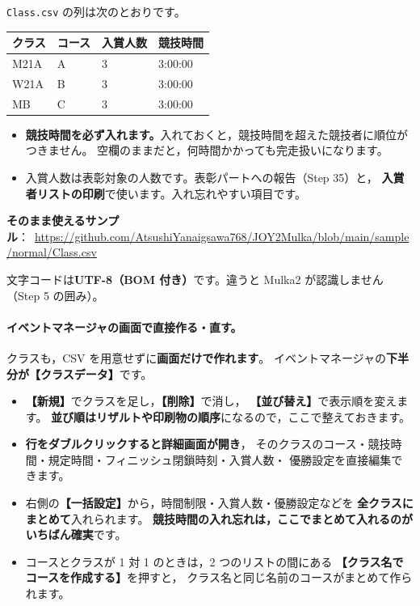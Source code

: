 \texttt{Class.csv} の列は次のとおりです。

\begin{center}
\small
\begin{tabular}{@{}llll@{}}
\toprule
クラス & コース & 入賞人数 & 競技時間 \\
\midrule
M21A & A & 3 & 3:00:00 \\
W21A & B & 3 & 3:00:00 \\
MB   & C & 3 & 3:00:00 \\
\bottomrule
\end{tabular}
\end{center}

\begin{itemize}
\item \textbf{競技時間を必ず入れます。}入れておくと，競技時間を超えた競技者に順位がつきません。
      空欄のままだと，何時間かかっても完走扱いになります。
\item 入賞人数は表彰対象の人数です。表彰パートへの報告（Step 35）と，
      \textbf{入賞者リストの印刷}で使います。入れ忘れやすい項目です。
\end{itemize}

\textbf{そのまま使えるサンプル}：\ \url{https://github.com/AtsushiYanaigsawa768/JOY2Mulka/blob/main/sample/normal/Class.csv}

文字コードは\textbf{UTF-8（BOM 付き）}です。違うと Mulka2 が認識しません（Step 5 の囲み）。

\paragraph{イベントマネージャの画面で直接作る・直す。}
クラスも，CSV を用意せずに\textbf{画面だけで作れます}。
イベントマネージャの\textbf{下半分が【クラスデータ】}です。\ver

\begin{itemize}
\item \textbf{【新規】}でクラスを足し，\textbf{【削除】}で消し，
      \textbf{【並び替え】}で表示順を変えます。
      \textbf{並び順はリザルトや印刷物の順序}になるので，ここで整えておきます。
\item \textbf{行をダブルクリックすると詳細画面が開き}，
      そのクラスのコース・競技時間・規定時間・フィニッシュ閉鎖時刻・入賞人数・
      優勝設定を直接編集できます。
\item 右側の\textbf{【一括設定】}から，時間制限・入賞人数・優勝設定などを
      \textbf{全クラスにまとめて}入れられます。
      \textbf{競技時間の入れ忘れは，ここでまとめて入れるのがいちばん確実}です。
\item コースとクラスが 1 対 1 のときは，2 つのリストの間にある
      \textbf{【クラス名でコースを作成する】}を押すと，
      クラス名と同じ名前のコースがまとめて作られます。
\end{itemize}

